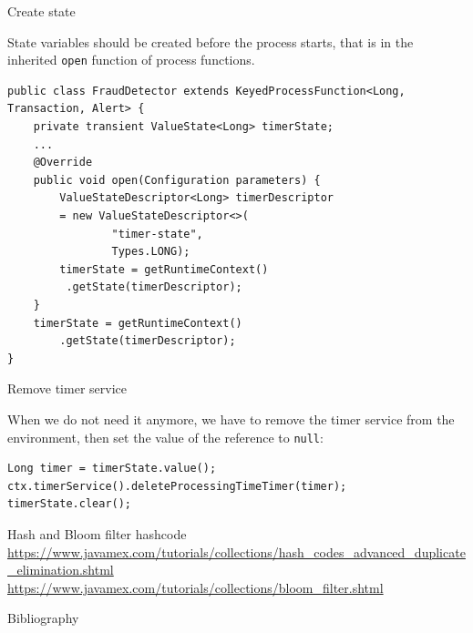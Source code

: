 \documentclass[blue]{beamer}
\begin{document}
\begin{frame}[fragile]{Create state}
\small{
State variables should be created before the process starts, that is in the inherited \texttt{open} function of process functions.

\begin{lstlisting}
public class FraudDetector extends KeyedProcessFunction<Long,
Transaction, Alert> {
    private transient ValueState<Long> timerState;
    ...
    @Override
    public void open(Configuration parameters) {
        ValueStateDescriptor<Long> timerDescriptor 
        = new ValueStateDescriptor<>(
                "timer-state",
                Types.LONG);
        timerState = getRuntimeContext()
         .getState(timerDescriptor);
    }
    timerState = getRuntimeContext()
        .getState(timerDescriptor);
}    
\end{lstlisting}
}
\end{frame}

\begin{frame}[fragile]{Remove timer service}

When we do not need it anymore, we have to remove the timer service from the environment, then set the value of the reference to \texttt{null}:
\begin{lstlisting}
Long timer = timerState.value();
ctx.timerService().deleteProcessingTimeTimer(timer);
timerState.clear();
\end{lstlisting}
\end{frame}

\begin{frame}{Hash and Bloom filter}
hashcode \url{https://www.javamex.com/tutorials/collections/hash_codes_advanced_duplicate_elimination.shtml}
   \url{https://www.javamex.com/tutorials/collections/bloom_filter.shtml}
\end{frame}




\begin{frame}[allowframebreaks]{Bibliography}
\fontsize{8pt}{7.2}\selectfont


\end{frame}
\end{document}
